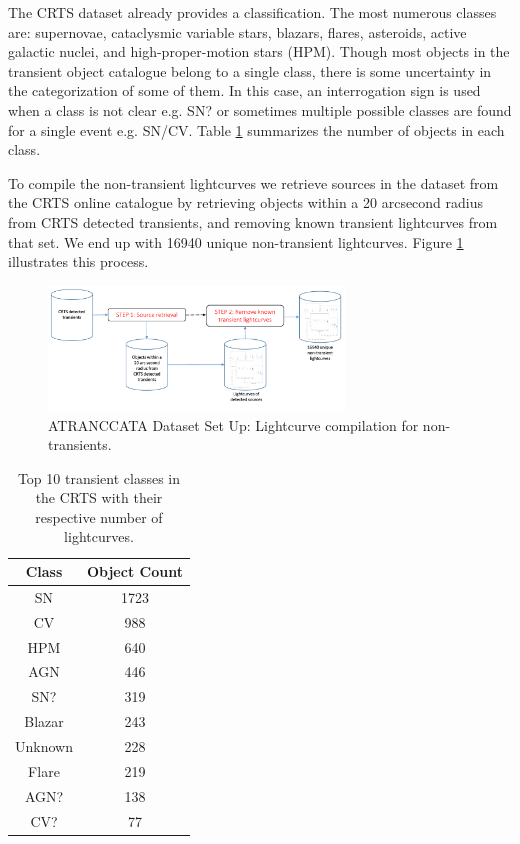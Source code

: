 \documentclass[usenatbib]{mnras}
\begin{document}
The CRTS dataset already provides a classification. 
The most numerous classes are: supernovae,
cataclysmic variable stars, blazars, flares, asteroids, active
galactic nuclei, and high-proper-motion stars (HPM). 
Though most objects in the transient object catalogue belong to a single class, 
there is some uncertainty in the categorization of some of them.  
In this case, an interrogation sign is used when a class is not clear 
e.g. SN? or sometimes multiple possible classes are found for a single 
event e.g. SN/CV. 
Table \ref{table:top_classes} summarizes the number of objects in each class. 

To compile the non-transient lightcurves we retrieve sources in the
dataset from the CRTS online catalogue by retrieving objects within a
20 arcsecond radius from CRTS detected transients, 
and removing known transient lightcurves from that set. 
We end up with 16940 unique non-transient lightcurves. Figure \ref{fig:non-transients} illustrates this process.

\begin{figure}
	\includegraphics[width=0.7\textwidth]{NonTransients.pdf}
  \caption{ATRANCCATA Dataset Set Up: Lightcurve compilation for non-transients.}
  \label{fig:non-transients}
\end{figure} 

\begin{table}
\centering
\begin{tabular}{c|c}
    \hline
    Class &  Object Count \\
    \hline
SN & 1723 \\
CV & 988 \\
HPM & 640 \\
AGN & 446 \\
SN? & 319 \\
Blazar & 243 \\
Unknown & 228 \\
Flare & 219 \\
AGN? & 138 \\
CV? & 77 \\
    \hline
\end{tabular}
\caption{Top 10 transient classes in the CRTS with their respective number of lightcurves.} 
\label{table:top_classes}
\end{table}
\end{document}
